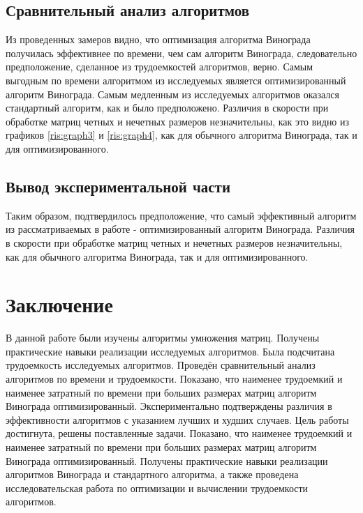 \section{Сравнительный анализ алгоритмов}\label{comparepart}


Из проведенных замеров видно, что оптимизация алгоритма Винограда получилась эффективнее по времени, чем сам алгоритм Винограда, следовательно 
предположение, сделанное из трудоемкостей алгоритмов, верно. Самым выгодным по времени алгоритмом из исследуемых является оптимизированный
алгоритм Винограда. Самым медленным из исследуемых алгоритмов оказался стандартный алгоритм, как и было предположено. Различия в скорости 
при обработке матриц четных и нечетных размеров незначительны, как это видно из графиков \ref{ris:graph3} и \ref{ris:graph4}, как для 
обычного алгоритма Винограда, так и для оптимизированного.


\section{Вывод экспериментальной части}\label{experimentresult}

Таким образом, подтвердилось предположение, что самый эффективный алгоритм из рассматриваемых в работе - оптимизированный алгоритм Винограда.
Различия в скорости при обработке матриц четных и нечетных размеров незначительны, как для обычного алгоритма Винограда, так и
для оптимизированного.



\chapter{Заключение}\label{exit}

В данной работе были изучены алгоритмы умножения матриц. 
Получены практические навыки реализации исследуемых алгоритмов. Была подсчитана трудоемкость исследуемых алгоритмов. 
Проведён сравнительный анализ алгоритмов по времени и трудоемкости. 
Показано, что наименее трудоемкий и наименее затратный по времени при
больших размерах матриц алгоритм Винограда оптимизированный.
Экспериментально подтверждены различия в эффективности алгоритмов с указанием лучших и худших случаев. 
Цель работы достигнута, решены поставленные задачи. 
Показано, что наименее трудоемкий и наименее затратный по времени при
больших размерах матриц алгоритм Винограда оптимизированный.
Получены практические навыки реализации алгоритмов Винограда и стандартного алгоритма, а также проведена исследовательская работа 
по оптимизации и вычислении трудоемкости алгоритмов.
